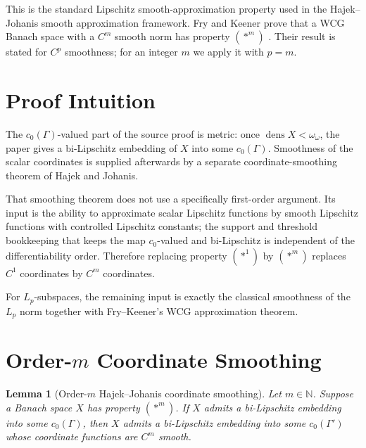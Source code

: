 \documentclass[11pt]{article}
\newtheorem{lemma}{Lemma}
\newcommand{\dens}{\operatorname{dens}}
\begin{document}
This is the standard Lipschitz smooth-approximation property used in the
Hajek--Johanis smooth approximation framework.  Fry and Keener prove that a
WCG Banach space with a \(C^m\) smooth norm has property \((\ast^m)\)
\cite[Theorem 4]{FryKeener09070241}.  Their result is stated for \(C^p\)
smoothness; for an integer \(m\) we apply it with \(p=m\).

\section*{Proof Intuition}

The \(c_0(\Gamma)\)-valued part of the source proof is metric: once
\(\dens X<\omega_\omega\), the paper gives a bi-Lipschitz embedding of \(X\)
into some \(c_0(\Gamma)\).  Smoothness of the scalar coordinates is supplied
afterwards by a separate coordinate-smoothing theorem of Hajek and Johanis.

That smoothing theorem does not use a specifically first-order argument.  Its
input is the ability to approximate scalar Lipschitz functions by smooth
Lipschitz functions with controlled Lipschitz constants; the support and
threshold bookkeeping that keeps the map \(c_0\)-valued and bi-Lipschitz is
independent of the differentiability order.  Therefore replacing property
\((\ast^1)\) by \((\ast^m)\) replaces \(C^1\) coordinates by \(C^m\)
coordinates.

For \(L_p\)-subspaces, the remaining input is exactly the classical smoothness
of the \(L_p\) norm together with Fry--Keener's WCG approximation theorem.

\section*{Order-\(m\) Coordinate Smoothing}

\begin{lemma}[Order-\(m\) Hajek--Johanis coordinate smoothing]
\label{lem:coordinate}
Let \(m\in\mathbb N\).  Suppose a Banach space \(X\) has property
\((\ast^m)\).  If \(X\) admits a bi-Lipschitz embedding into some
\(c_0(\Gamma)\), then \(X\) admits a bi-Lipschitz embedding into some
\(c_0(\Gamma')\) whose coordinate functions are \(C^m\) smooth.
\end{lemma}
\end{document}
